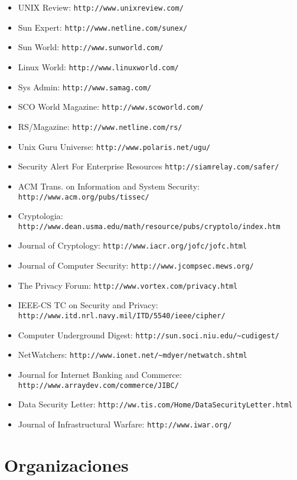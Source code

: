 \begin{itemize}
\item UNIX Review: {\tt http://www.unixreview.com/}
\item Sun Expert: {\tt http://www.netline.com/sunex/}
\item Sun World: {\tt http://www.sunworld.com/}
\item Linux World: {\tt http://www.linuxworld.com/}
\item Sys Admin: {\tt http://www.samag.com/}
\item SCO World Magazine: {\tt http://www.scoworld.com/}
\item RS/Magazine: {\tt http://www.netline.com/rs/}
\item Unix Guru Universe: {\tt http://www.polaris.net/ugu/}
\item Security Alert For Enterprise Resources {\tt http://siamrelay.com/safer/}
\item ACM Trans. on Information and System Security: {\tt http://www.acm.org/pubs/tissec/}
\item Cryptologia:\\
{\tt http://www.dean.usma.edu/math/resource/pubs/cryptolo/index.htm}
\item Journal of Cryptology: {\tt http://www.iacr.org/jofc/jofc.html}
\item Journal of Computer Security: {\tt http://www.jcompsec.mews.org/}
\item The Privacy Forum: {\tt http://www.vortex.com/privacy.html}
\item IEEE-CS TC on Security and Privacy:\\
{\tt http://www.itd.nrl.navy.mil/ITD/5540/ieee/cipher/}
\item Computer Underground Digest: {\tt http://sun.soci.niu.edu/\~{}cudigest/}
\item NetWatchers: {\tt http://www.ionet.net/\~{}mdyer/netwatch.shtml}
\item Journal for Internet Banking and Commerce: {\tt http://www.arraydev.com/commerce/JIBC/}
\item Data Security Letter: {\tt http://ww.tis.com/Home/DataSecurityLetter.html}
\item Journal of Infrastructural Warfare: {\tt http://www.iwar.org/}
\end{itemize}
\section{Organizaciones}
